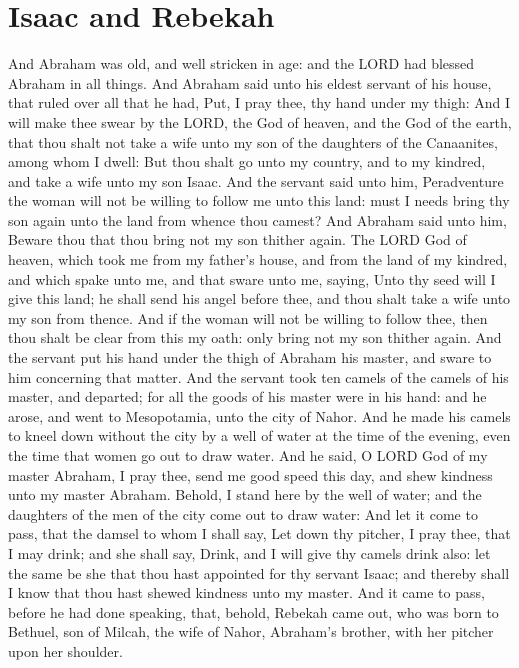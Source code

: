 \section*{Isaac and Rebekah}
\begin{biblechapter} %
\verse And Abraham was old, and well stricken in age: and the LORD had blessed Abraham in all things.
\verse And Abraham said unto his eldest servant of his house, that ruled over all that he had, Put, I pray thee, thy hand under my thigh:
\verse And I will make thee swear by the LORD, the God of heaven, and the God of the earth, that thou shalt not take a wife unto my son of the daughters of the Canaanites, among whom I dwell:
\verse But thou shalt go unto my country, and to my kindred, and take a wife unto my son Isaac.
\verse And the servant said unto him, Peradventure the woman will not be willing to follow me unto this land: must I needs bring thy son again unto the land from whence thou camest?
\verse And Abraham said unto him, Beware thou that thou bring not my son thither again.
\verse The LORD God of heaven, which took me from my father's house, and from the land of my kindred, and which spake unto me, and that sware unto me, saying, Unto thy seed will I give this land; he shall send his angel before thee, and thou shalt take a wife unto my son from thence.
\verse And if the woman will not be willing to follow thee, then thou shalt be clear from this my oath: only bring not my son thither again.
\verse And the servant put his hand under the thigh of Abraham his master, and sware to him concerning that matter.
\verse And the servant took ten camels of the camels of his master, and departed; for all the goods of his master were in his hand: and he arose, and went to Mesopotamia, unto the city of Nahor.
\verse And he made his camels to kneel down without the city by a well of water at the time of the evening, even the time that women go out to draw water.
\verse And he said, O LORD God of my master Abraham, I pray thee, send me good speed this day, and shew kindness unto my master Abraham.
\verse Behold, I stand here by the well of water; and the daughters of the men of the city come out to draw water:
\verse And let it come to pass, that the damsel to whom I shall say, Let down thy pitcher, I pray thee, that I may drink; and she shall say, Drink, and I will give thy camels drink also: let the same be she that thou hast appointed for thy servant Isaac; and thereby shall I know that thou hast shewed kindness unto my master.
\verse And it came to pass, before he had done speaking, that, behold, Rebekah came out, who was born to Bethuel, son of Milcah, the wife of Nahor, Abraham's brother, with her pitcher upon her shoulder.

\end{biblechapter}
